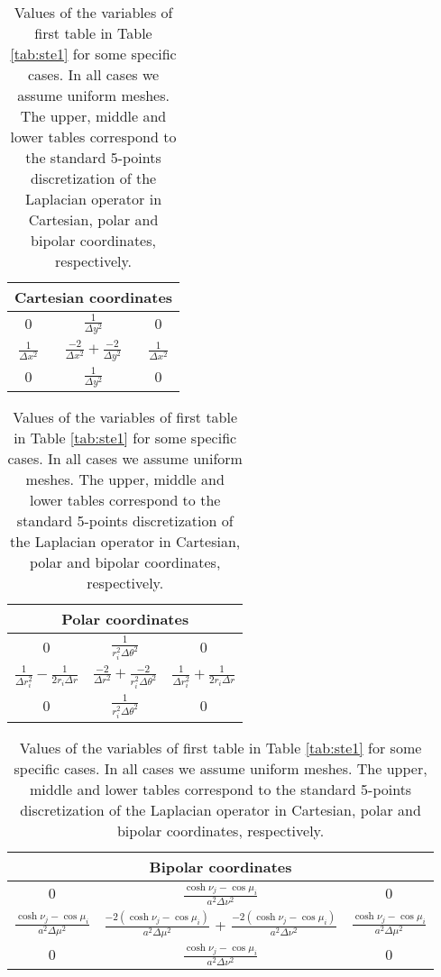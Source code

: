 \documentclass[preprint,12pt]{elsarticle}
\begin{document}
\begin{table}[p]
\centering

\begin{tabular}{|c|c|c|} 
\hline
\multicolumn{3}{|c|}{Cartesian coordinates}\\
\hline
$0$ & $\frac{1}{\Delta y^2}$ & $0$ \\ \hline
$\frac{1}{\Delta x^2}$ & $\frac{-2}{\Delta x^2} + \frac{-2}{\Delta y^2}$  & $\frac{1}{\Delta x^2}$ \\ \hline
$0$ & $\frac{1}{\Delta y^2}$  & $0$  \\ \hline
\end{tabular}

\vspace{0.5cm}

\begin{tabular}{|c|c|c|} \hline
\multicolumn{3}{|c|}{Polar coordinates}\\
\hline
$0$ & $\frac{1}{r_i^2 \Delta \theta^2}$ & $0$ \\ \hline
$\frac{1}{\Delta r_i^2} - \frac{1}{2 r_i \Delta r}$ & $\frac{-2}{\Delta r^2} + \frac{-2}{r_i^2 \Delta \theta^2}$  & $\frac{1}{\Delta r_i^2} + \frac{1}{2 r_i \Delta r}$ \\ \hline
$0$ & $\frac{1}{r_i^2 \Delta \theta^2}$  & $0$  \\ \hline
\end{tabular}

\vspace{0.5cm}

\begin{tabular}{|c|c|c|} \hline
\multicolumn{3}{|c|}{Bipolar coordinates}\\
\hline
$0$ & $\frac{\cosh \nu_j - \cos \mu_i}{a^2 \Delta \nu^2}$ & $0$ \\ \hline
$\frac{\cosh \nu_j - \cos \mu_i}{a^2 \Delta \mu^2}$ & $\frac{-2(\cosh \nu_j - \cos \mu_i)}{a^2 \Delta \mu^2}$ + $\frac{-2(\cosh \nu_j - \cos \mu_i)}{a^2 \Delta \nu^2}$  & $\frac{\cosh \nu_j - \cos \mu_i}{a^2 \Delta \mu^2}$ \\ \hline
$0$ & $\frac{\cosh \nu_j - \cos \mu_i}{a^2 \Delta \nu^2}$  & $0$  \\ \hline
\end{tabular}

\vspace{0.5cm}
\caption{Values of the variables of first table in Table
  \ref{tab:ste1} for some specific cases. In all cases we assume
  uniform meshes. The upper, middle and lower tables correspond to
    the standard 5-points discretization of the Laplacian operator in Cartesian, polar
    and bipolar coordinates, respectively.}
\label{tab:ste2}
\end{table}
\end{document}
